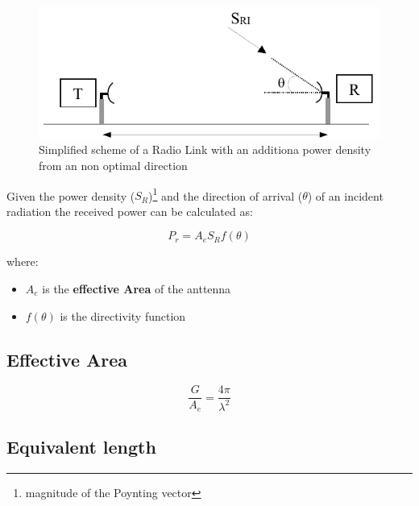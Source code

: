\begin{figure}[h]
	\centering
	\includegraphics[scale=0.3]{Immagini/SR}
	
	\caption{Simplified scheme of a Radio Link with an additiona power density from an non optimal direction}
	\label{fig:SR}
\end{figure}

Given the power density ($S_R$)\footnote{magnitude of the Poynting vector} and the direction of arrival ($ \theta $) of an incident radiation the received power can be calculated as:

\begin{equation}
	P_r=A_{\textit{e}} S_R f(\theta)
\end{equation}

where:

\begin{itemize}
	\item $A_{\textit{e}}$ is the \textbf{effective Area} of the anttenna
	\item $f(\theta)$ is the directivity function

\end{itemize}




\subsection{Effective Area} %
\label{sub:effective_area}



\begin{equation}
	\frac{G}{A_e}=\frac{4 \pi }{\lambda^2}
\end{equation}



\subsection{Equivalent length} %
\label{sub:equivalent_length}


